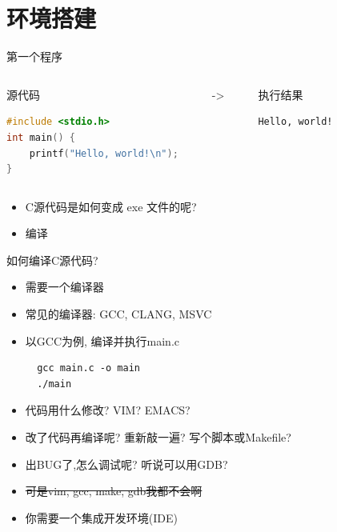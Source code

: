 \section{环境搭建}

\begin{frame}[fragile]{第一个程序}
\begin{columns}[T,onlytextwidth]
\begin{block}{源代码}
\small\begin{lstlisting}[language=c]
#include <stdio.h>
int main() {
    printf("Hello, world!\n");
}
\end{lstlisting}
\end{block}

\begin{block}{}\end{block}
\begin{block}{->}\end{block}
\begin{block}{}\end{block}

\begin{block}{执行结果}
\small\begin{lstlisting}
Hello, world!
\end{lstlisting}
\end{block}
\end{columns}

\begin{itemize}[<+- | alert@+>]
\item C源代码是如何变成 exe 文件的呢?
\item 编译
\end{itemize}
\end{frame}

\begin{frame}[fragile]{如何编译C源代码?}
\begin{itemize}[<+- | alert@+>]
\item 需要一个编译器
\item 常见的编译器: GCC, CLANG, MSVC
\item 以GCC为例, 编译并执行main.c
\begin{verbatim}
  gcc main.c -o main
  ./main
\end{verbatim}
\item 代码用什么修改? VIM? EMACS?
\item 改了代码再编译呢? 重新敲一遍? 写个脚本或Makefile?
\item 出BUG了,怎么调试呢? 听说可以用GDB?
\item \sout{可是vim, gcc, make, gdb我都不会啊}
\item 你需要一个集成开发环境(IDE)
\end{itemize}
\end{frame}


